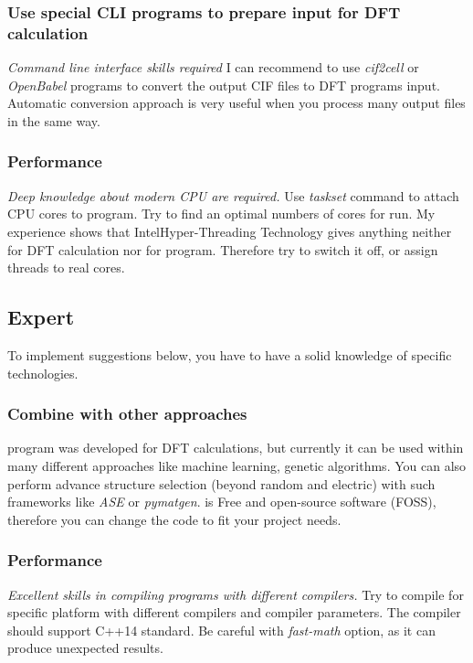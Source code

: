 \documentclass[a4paper,10pt]{article}
\begin{document}
\subsubsection{ Use special CLI programs to prepare input for DFT calculation }
\textit{Command line interface skills required } I can recommend to use \mbox{\textit{cif2cell}}\cite{cif2cell} or \mbox{\textit{OpenBabel}}\cite{OpenBabel} programs to convert the output CIF files to DFT programs input. Automatic conversion approach is very useful when you process many output files in the same way. 

\subsubsection{ Performance }
\textit{Deep knowledge about modern CPU  are required.} Use \mbox{\textit{taskset}} command to attach CPU cores to \sups{} program. Try to find an optimal numbers of cores for \sups{} run. My experience shows that Intel\textregistered Hyper-Threading Technology gives anything neither for DFT calculation nor for \sups{} program. Therefore try to switch it off, or assign \sups{} threads to real cores.

\subsection*{Expert}
To implement suggestions below, you have to have a solid knowledge of specific technologies.

\subsubsection{Combine \sups{} with other approaches }
\Sups{} program was developed for DFT calculations, but currently it can be used within many different approaches like machine learning\cite{Dieb2018, Midgley2021}, genetic\cite{Han2018} algorithms. You can also perform advance structure selection (beyond random and electric) with such frameworks like \mbox{\textit{ASE}} or \mbox{\textit{pymatgen}}. \Sups{} is Free and open-source software (FOSS), therefore you can change the code to fit your project needs.

\subsubsection{ Performance }
\textit{Excellent skills in compiling programs with different compilers.} Try to compile \sups{} for specific platform with different compilers and compiler parameters. The compiler should support C++14 standard. Be careful with \mbox{\textit{fast-math}} option, as it can produce unexpected results.
\end{document}
